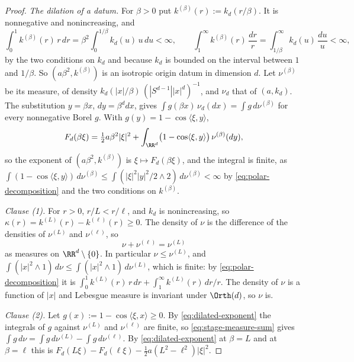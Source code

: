 \begin{proof}
\leanok
\emph{The dilation of a datum.} For $\beta > 0$ put $k^{(\beta)}(r) := k_d(r/\beta)$. It is
nonnegative and nonincreasing, and
\[
  \int_0^1 k^{(\beta)}(r)\,r\,dr = \beta^2\int_0^{1/\beta}k_d(u)\,u\,du < \infty, \qquad
  \int_1^\infty k^{(\beta)}(r)\,\frac{dr}{r} = \int_{1/\beta}^\infty k_d(u)\,\frac{du}{u} < \infty ,
\]
by the two conditions on $k_d$ and because $k_d$ is bounded on the interval between $1$ and
$1/\beta$. So $(a\beta^2, k^{(\beta)})$ is an isotropic origin datum in dimension $d$. Let
$\nu^{(\beta)}$ be its \Levy{} measure, of density $k_d(|x|/\beta)\,(|S^{d-1}||x|^d)^{-1}$, and
$\nu_d$ that of $(a,k_d)$. The substitution $y = \beta x$, $dy = \beta^d dx$, gives
$\int g(\beta x)\,\nu_d(dx) = \int g\,d\nu^{(\beta)}$ for every nonnegative Borel $g$. With
$g(y) = 1 - \cos\langle\xi,y\rangle$,
\begin{equation}\label{eq:dilated-exponent}
  F_d(\beta\xi) = \tfrac12 a\beta^2|\xi|^2
     + \int_{\RR^d}\bigl(1 - \cos\langle\xi,y\rangle\bigr)\,\nu^{(\beta)}(dy) ,
\end{equation}
so the exponent of $(a\beta^2, k^{(\beta)})$ is $\xi \mapsto F_d(\beta\xi)$, and the integral is
finite, as $\int(1 - \cos\langle\xi,y\rangle)\,d\nu^{(\beta)}
\le \int(|\xi|^2|y|^2/2 \wedge 2)\,d\nu^{(\beta)} < \infty$ by \ref{eq:polar-decomposition} and
the two conditions on $k^{(\beta)}$.

\emph{Clause (1).} For $r > 0$, $r/L < r/\ell$, and $k_d$ is nonincreasing, so
$\kappa(r) = k^{(L)}(r) - k^{(\ell)}(r) \ge 0$. The density of $\nu$ is the difference of the
densities of $\nu^{(L)}$ and $\nu^{(\ell)}$, so
\begin{equation}\label{eq:stage-measure-sum}
  \nu + \nu^{(\ell)} = \nu^{(L)}
\end{equation}
as measures on $\RR^d \setminus \{0\}$. In particular $\nu \le \nu^{(L)}$, and
$\int(|x|^2 \wedge 1)\,d\nu \le \int(|x|^2 \wedge 1)\,d\nu^{(L)}$, which is finite: by
\ref{eq:polar-decomposition} it is $\int_0^1 k^{(L)}(r)\,r\,dr + \int_1^\infty k^{(L)}(r)\,dr/r$.
The density of $\nu$ is a function of $|x|$ and Lebesgue measure is invariant under
$\Orth(d)$, so $\nu$ is.

\emph{Clause (2).} Let $g(x) := 1 - \cos\langle\xi,x\rangle \ge 0$. By
\ref{eq:dilated-exponent} the integrals of $g$ against $\nu^{(L)}$ and $\nu^{(\ell)}$ are finite,
so \ref{eq:stage-measure-sum} gives
$\int g\,d\nu = \int g\,d\nu^{(L)} - \int g\,d\nu^{(\ell)}$. By \ref{eq:dilated-exponent} at
$\beta = L$ and at $\beta = \ell$ this is
$F_d(L\xi) - F_d(\ell\xi) - \tfrac12 a(L^2 - \ell^2)|\xi|^2$.


\end{proof}

